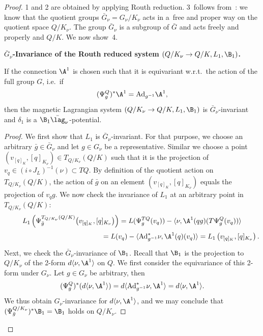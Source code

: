 \begin{proof}
 1 and 2 are obtained by applying Routh reduction. 3~follows from~\cite[p.~152]{MarsdenHamRed}: we know that the quotient groups $\bar G_\nu=G_\nu/K_\nu$ acts in a~free and proper way on the quotient space $Q/K_\nu$.  The group $\bar G_\nu$ is a subgroup of $\bar G$ and acts freely and properly and $Q/K$. We now show~4.

{\bf $\bar G_\nu$-Invariance of the Routh reduced system $(Q/K_\nu\to Q/K, L_1,\B_1)$.}



\begin{lemma} If the connection $\A^{1}$ is chosen such that it is equivariant w.r.t.\ the action of the full group $G$, i.e.\ if
\[
(\Psi^Q_g)^*\A^{1} = {\rm Ad}_{g^{-1}}\A^{1},
\]then the magnetic Lagrangian system $(Q/K_\nu\to Q/K, L_1,\B_1)$ is $\bar G_\nu$-invariant and $\delta_1$ is a $\B_1\bar\lag_\nu$-potential.
\end{lemma}
\begin{proof}
  We f\/irst show that $L_1$ is $\bar G_\nu$-invariant. For that purpose, we choose an arbitrary $\bar g\in \bar G_\nu$ and let $g\in G_\nu$ be a representative. Similar we choose a point $(v_{[q]_K},[q]_{K_\nu})\in T_{Q/K_\nu}(Q/K)$ such that it is the projection of $v_q\in (i\circ J_L)^{-1}(\nu)\subset TQ$. By def\/inition of the quotient action on $T_{Q/K_\nu}(Q/K)$, the action of $\bar g$ on an element $(v_{[q]_K},[q]_{K_\nu})$ equals the projection of $v_qg$. We now check the invariance of $L_1$ at an arbitrary point in $T_{Q/K_\nu}(Q/K)$:
  \begin{gather*}
    L_1\left(\Psi^{T_{Q/K_\nu}(Q/K)}_{\bar g}\big(v_{[q]_K},[q]_{K_\nu}\big)\right)   = L(\Psi^{TQ}_g(v_q) )- \langle \nu,\A^{1}(qg)(T\Psi^{Q}_g(v_q) )\rangle \\ \phantom{L_1\left(\Psi^{T_{Q/K_\nu}(Q/K)}_{\bar g}\big(v_{[q]_K},[q]_{K_\nu}\big)\right)}{}
    = L(v_q) - \langle {\rm Ad}_{g^{-1}}^*\nu , \A^{1}(q)(v_q) \rangle  = L_1\left(v_{[q]_K},[q]_{K_\nu}\right).
  \end{gather*}
Next, we check the $\bar G_\nu$-invariance of $\B_1$.  Recall that $\B_1$ is the projection to $Q/K_\nu$ of the 2-form $d\langle\nu,\A^{1}\rangle$ on $Q$. We f\/irst consider the equivariance of this 2-form under $G_\nu$. Let $g\in G_\nu$ be arbitrary, then
  \[
  (\Psi^{Q}_{g})^*(d\langle\nu,\A^{1}\rangle) =  d\langle {\rm Ad}^*_{g^{-1}}\nu ,\A^1\rangle = d\langle\nu,\A^{1}\rangle.
  \]We thus obtain $G_\nu$-invariance for $d\langle\nu,\A^{1}\rangle$, and we may conclude that $(\Psi^{Q/K_\nu}_{\bar g})^* \B_1 = \B_1$ holds on $Q/K_\nu$.


\end{proof}
\end{proof}

